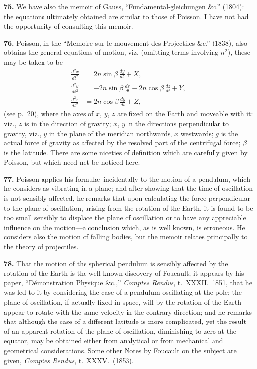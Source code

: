 \documentclass[11pt,a4paper]{book}
\begin{document}
\textbf{75.} We have also the memoir of Gauss, ``Fundamental-gleichungen \&c.'' (1804): the equations ultimately obtained are similar to those of Poisson. I have not had the opportunity of consulting this memoir.

\textbf{76.} Poisson, in the ``Memoire sur le mouvement des Projectiles \&c.'' (1838), also obtains the general equations of motion, viz. (omitting terms involving $n^2$), these may be taken to be
\begin{align*}
\frac{d^2x}{dt^2} &= 2n\sin\beta\,\frac{dy}{dt} + X, \\
\frac{d^2y}{dt^2} &= -2n\sin\beta\,\frac{dx}{dt} - 2n\cos\beta\,\frac{dz}{dt} + Y, \\
\frac{d^2z}{dt^2} &= 2n\cos\beta\,\frac{dy}{dt} + Z,
\end{align*}
(see p.~20), where the axes of $x$, $y$, $z$ are fixed on the Earth and moveable with it: viz., $z$ is in the direction of gravity; $x$, $y$ in the directions perpendicular to gravity, viz., $y$ in the plane of the meridian northwards, $x$ westwards; $g$ is the actual force of gravity as affected by the resolved part of the centrifugal force; $\beta$ is the latitude. There are some niceties of definition which are carefully given by Poisson, but which need not be noticed here.

\textbf{77.} Poisson applies his formul\ae\ incidentally to the motion of a pendulum, which he considers as vibrating in a plane; and after showing that the time of oscillation is not sensibly affected, he remarks that upon calculating the force perpendicular to the plane of oscillation, arising from the rotation of the Earth, it is found to be too small sensibly to displace the plane of oscillation or to have any appreciable influence on the motion---a conclusion which, as is well known, is erroneous. He considers also the motion of falling bodies, but the memoir relates principally to the theory of projectiles.

\textbf{78.} That the motion of the spherical pendulum is sensibly affected by the rotation of the Earth is the well-known discovery of Foucault; it appears by his paper, ``D\'emonstration Physique \&c.,'' \textit{Comptes Rendus}, t.~XXXII.~1851, that he was led to it by considering the case of a pendulum oscillating at the pole; the plane of oscillation, if actually fixed in space, will by the rotation of the Earth appear to rotate with the same velocity in the contrary direction; and he remarks that although the case of a different latitude is more complicated, yet the result of an apparent rotation of the plane of oscillation, diminishing to zero at the equator, may be obtained either from analytical or from mechanical and geometrical considerations. Some other Notes by Foucault on the subject are given, \textit{Comptes Rendus}, t.~XXXV.~(1853).
\end{document}
